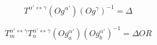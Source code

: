 $$T^{\alpha'\leftrightarrow\gamma}\left(Og^{\alpha'}\right)\left(Og^{\gamma}\right)^{-1} = \Delta  \label{eq:1}$$

$$T_{m}^{\alpha'\leftrightarrow\gamma}T_{n}^{\alpha'\leftrightarrow\gamma}\left(Og_{a}^{\alpha'}\right)\left(Og_{b}^{\alpha'}\right)^{-1} = \Delta OR \label{eq:2}$$

